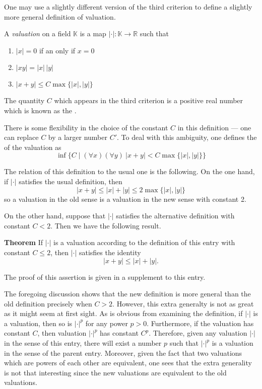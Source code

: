 \documentclass[12pt]{article}
\begin{document}
One may use a slightly different version of the third criterion to define a slightly more general definition of valuation.

A \emph{valuation} on a field $\mathbb{K}$ is a map $| \cdot | \colon \mathbb{K} \to \mathbb{R}$ such that
\begin{enumerate}
\item $|x| = 0$ if an only if $x = 0$
\item $|xy| = |x| \, |y|$
\item $|x + y| \le C \max \{ |x|, |y| \}$
\end{enumerate}
The quantity $C$ which appears in the third criterion is a positive real number which is known as the .

There is some flexibility in the choice of the constant $C$ in this definition --- one can replace $C$ by a larger number $C'$.  To deal with this ambiguity, one defines the  of the valuation as
 $$\inf \{ C \mid (\forall x) (\forall y) \> |x + y| < C \max \{ |x|, |y| \} \}$$

The relation of this definition to the usual one is the following.  On the one hand, if $| \cdot |$ satisfies the usual definition, then
 $$|x + y| \le |x| + |y| \le 2 \max \{ |x|, |y| \}$$
so a valuation in the old sense is a valuation in the new sense with constant 2.

On the other hand, suppose that $| \cdot |$ satisfies the alternative definition with constant $C < 2$.  Then we have the following result.

\textbf{Theorem}  If $| \cdot |$ is a valuation according to the definition of this entry with constant $C \le 2$, then $| \cdot |$ satisfies the identity
 $$| x + y | \le |x| + |y|.$$

The proof of this assertion is given in a supplement to this entry.

The foregoing discussion shows that the new definition is more general than the old definition precisely when $C > 2$.  However, this extra generalty is not as great as it might seem at first sight.  As is obvious from examining the definition, if $| \cdot |$ is a valuation, then so is $| \cdot |^p$ for any power $p > 0$.  Furthermore, if the valuation has constant $C$, then valuation $| \cdot |^p$ has constant $C^p$.  Therefore, given any valuation $| \cdot |$ in the sense of this entry, there will exist a number $p$ such that $| \cdot |^p$ is a valuation in the sense of the parent entry.  Moreover, given the fact that two valuations which are powers of each other are equivalent, one sees that the extra generality is not that interesting since the new valuations are equivalent to the old valuations.
\end{document}
